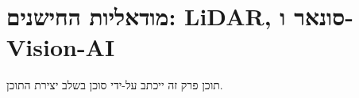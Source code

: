 \section{מודאליות החישנים: LiDAR, סונאר ו-Vision-AI}
\label{sec:sensors}

תוכן פרק זה ייכתב על-ידי סוכן  בשלב יצירת התוכן.
